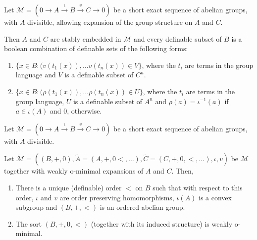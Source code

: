 \documentclass[10pt,a4paper]{amsart}
\newcommand{\CM}{{\mathcal M}}
\begin{document}
    \begin{fact}\label{F:relQE in short exact}
        Let $\CM=(0\to A\xrightarrow[]{\iota} B\xrightarrow{v}C\to 0)$ be a short exact sequence of abelian groups, with $A$ divisible, allowing expansion of the group structure on $A$ and $C$. 

        Then $A$ and $C$ are stably embedded in $\CM$ and every definable subset of $B$ is a boolean combination of definable sets of the following forms:
        \begin{enumerate}
            \item $\{x\in B: (v(t_1(x)),\dots v(t_n(x))\in V\}$, where the $t_i$ are terms in the group language and $V$ is a definable subset of $C^n$.
            \item $\{x\in B: (\rho(t_1(x)),\dots \rho(t_n(x))\in U\}$, where the $t_i$ are terms in the group language, $U$ is a definable subset of $A^n$ and $\rho(a)=\iota^{-1}(a)$ if $a\in \iota(A)$ and $0$, otherwise.
        \end{enumerate}
    \end{fact}

    \begin{proposition}\label{P:wom shortexact}
    Let $\CM=(0\to A\xrightarrow[]{\iota} B\xrightarrow{v}C\to 0)$ be a short exact sequence of abelian groups, with $A$ divisible. 

        Let $\widetilde{\CM}=((B,+,0),\widetilde{A}=(A,+,0<,\dots),\widetilde{C}=(C,+,0,<,\dots),\iota,v)$ be $\CM$ together with weakly o-minimal expansions of $A$ and $C$. Then, 

        \begin{enumerate}
            \item There is a unique (definable) order $<$ on $B$ such that with respect to this order, $\iota$ and $v$ are order preserving homomorphisms, $\iota(A)$ is a convex subgroup and $(B,+,<)$ is an ordered abelian group.
            \item The sort $(B,+,0,<)$ (together with its induced structure) is weakly o-minimal.
        \end{enumerate}
    \end{proposition}
\end{document}
